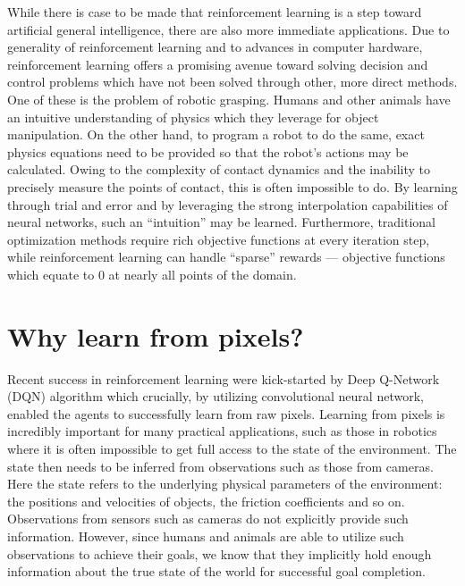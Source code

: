 While there is case to be made that reinforcement learning is a step toward
artificial general intelligence, there are also more immediate applications.
Due to generality of reinforcement learning and to advances in computer hardware,
reinforcement learning offers a promising avenue toward solving decision and
control problems which have not been solved through other, more direct methods.
One of these is the problem of robotic grasping.
Humans and other animals have an intuitive understanding of physics which they
leverage for object manipulation.
On the other hand, to program a robot to do the same, exact
physics equations need to be provided so that the robot's actions may be calculated.
Owing to the complexity of contact dynamics and the inability to precisely
measure the points of contact, this is often impossible to do.
By learning through trial and error and by leveraging the strong interpolation
capabilities of neural networks, such an ``intuition'' may be learned.
Furthermore, traditional optimization methods require rich objective functions
at every iteration step, while reinforcement learning can handle ``sparse'' rewards ---
objective functions which equate to 0 at nearly all points of the domain.

\section{Why learn from pixels?}
Recent success in reinforcement learning were kick-started by Deep Q-Network (DQN) 
algorithm \cite{mnih2013atari} which crucially,
by utilizing convolutional neural network, enabled the agents to successfully learn from raw pixels.
Learning from pixels is incredibly important for many practical applications,
such as those in robotics
where it is often impossible to get full access to the state of the environment.
The state then needs to be inferred from observations such as those from cameras.
Here the state refers to the underlying physical parameters of the environment:
the positions and velocities of objects, the friction coefficients and so on.
Observations from sensors such as cameras do not explicitly provide such information.
However, since humans and animals are able to utilize such observations to achieve their
goals, we know that they implicitly hold enough information about the true state
of the world for successful goal completion.

